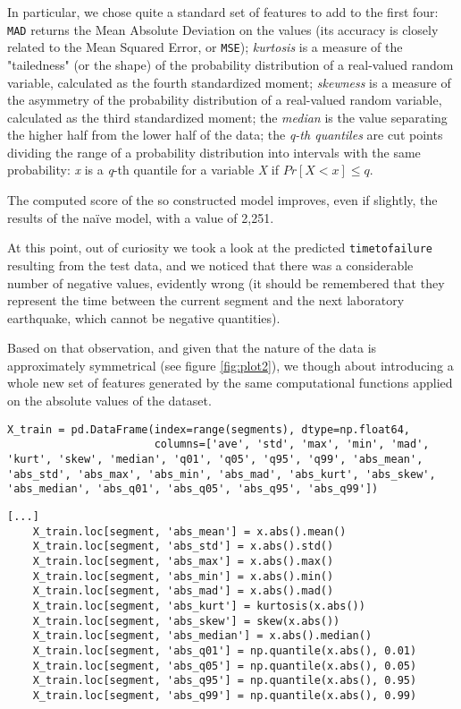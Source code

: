 In particular, we chose quite a standard set of features to add to the first four: \texttt{MAD} returns the Mean Absolute Deviation on the values (its accuracy is closely related to the Mean Squared Error, or \texttt{MSE}); \textit{kurtosis} is a measure of the "tailedness" (or the shape) of the probability distribution of a real-valued random variable, calculated as the fourth standardized moment; \textit{skewness} is a measure of the asymmetry of the probability distribution of a real-valued random variable, calculated as the third standardized moment; the \textit{median} is the value separating the higher half from the lower half of the data; the \textit{q-th quantiles} are cut points dividing the range of a probability distribution into intervals with the same probability: \textit{x} is a \textit{q}-th quantile for a variable \textit{X} if \(Pr[X<x]\leq q\).

The computed score of the so constructed model improves, even if slightly, the results of the na{\"i}ve model, with a value of 2,251.

\bigbreak

At this point, out of curiosity we took a look at the predicted \texttt{time\textunderscore to\textunderscore failure} resulting from the test data, and we noticed that there was a considerable number of negative values, evidently wrong (it should be remembered that they represent the time between the current segment and the next laboratory earthquake, which cannot be negative quantities).

Based on that observation, and given that the nature of the data is approximately symmetrical (see figure \ref{fig:plot2}), we though about introducing a whole new set of features generated by the same computational functions applied on the absolute values of the dataset.

\begin{lstlisting}[firstnumber=39]
X_train = pd.DataFrame(index=range(segments), dtype=np.float64,
                       columns=['ave', 'std', 'max', 'min', 'mad', 'kurt', 'skew', 'median', 'q01', 'q05', 'q95', 'q99', 'abs_mean', 'abs_std', 'abs_max', 'abs_min', 'abs_mad', 'abs_kurt', 'abs_skew', 'abs_median', 'abs_q01', 'abs_q05', 'abs_q95', 'abs_q99'])
\end{lstlisting}

\begin{lstlisting}[firstnumber=66]
	[...]
    X_train.loc[segment, 'abs_mean'] = x.abs().mean()
    X_train.loc[segment, 'abs_std'] = x.abs().std()
    X_train.loc[segment, 'abs_max'] = x.abs().max()
    X_train.loc[segment, 'abs_min'] = x.abs().min()
    X_train.loc[segment, 'abs_mad'] = x.abs().mad()
    X_train.loc[segment, 'abs_kurt'] = kurtosis(x.abs())
    X_train.loc[segment, 'abs_skew'] = skew(x.abs())
    X_train.loc[segment, 'abs_median'] = x.abs().median()
    X_train.loc[segment, 'abs_q01'] = np.quantile(x.abs(), 0.01)
    X_train.loc[segment, 'abs_q05'] = np.quantile(x.abs(), 0.05)
    X_train.loc[segment, 'abs_q95'] = np.quantile(x.abs(), 0.95)
    X_train.loc[segment, 'abs_q99'] = np.quantile(x.abs(), 0.99)
\end{lstlisting}

